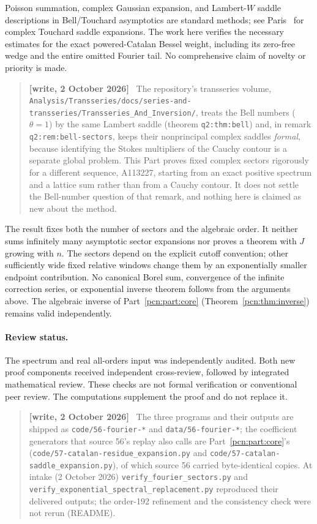 \documentclass[11pt,letterpaper]{article}
\theoremstyle{remark}\newtheorem{remark}[theorem]{Remark}
\newenvironment{writenote}{\par\smallskip\begin{quote}\small\textbf{[write, 2 October 2026]}\ }{\end{quote}\smallskip}
\newcommand{\repopath}[1]{\nolinkurl{#1}}
\begin{document}
Poisson summation, complex Gaussian expansion, and Lambert-$W$ saddle descriptions in \mbox{Bell/Touchard} asymptotics are standard methods; see Paris~\cite{Paris} for complex Touchard saddle expansions. The work here verifies the necessary estimates for the exact powered-Catalan Bessel weight, including its zero-free wedge and the entire omitted Fourier tail. No comprehensive claim of novelty or priority is made.
\begin{writenote}
The repository's transseries volume, \repopath{Analysis/Transseries/docs/series-and-transseries/Transseries_And_Inversion/}, treats the Bell numbers ($\theta=1$) by the same Lambert saddle (theorem \texttt{q2:thm:bell}) and, in remark \texttt{q2:rem:bell-sectors}, keeps their nonprincipal complex saddles \emph{formal}, because identifying the Stokes multipliers of the Cauchy contour is a separate global problem. This Part proves fixed complex sectors rigorously for a different sequence, A113227, starting from an exact positive spectrum and a lattice sum rather than from a Cauchy contour. It does not settle the Bell-number question of that remark, and nothing here is claimed as new about the method.
\end{writenote}

The result fixes both the number of sectors and the algebraic order. It neither sums infinitely many asymptotic sector expansions nor proves a theorem with $J$ growing with $n$. The sectors depend on the explicit cutoff convention; other sufficiently wide fixed relative windows change them by an exponentially smaller endpoint contribution. No canonical Borel sum, convergence of the infinite correction series, or exponential inverse theorem follows from the arguments above. The algebraic inverse of Part~\ref{pcn:part:core} (Theorem~\ref{pcn:thm:inverse}) remains valid independently.

\paragraph{Review status.}
The spectrum and real all-orders input was independently audited. Both new proof components received independent cross-review, followed by integrated mathematical review. These checks are not formal verification or conventional peer review. The computations supplement the proof and do not replace it.
\begin{writenote}
The three programs and their outputs are shipped as \repopath{code/56-fourier-*} and \repopath{data/56-fourier-*}; the coefficient generators that source 56's replay also calls are Part~\ref{pcn:part:core}'s (\repopath{code/57-catalan-residue_expansion.py} and \repopath{code/57-catalan-saddle_expansion.py}), of which source 56 carried byte-identical copies. At intake (2 October 2026) \texttt{verify\_fourier\_sectors.py} and \texttt{verify\_exponential\_spectral\_replacement.py} reproduced their delivered outputs; the order-192 refinement and the consistency check were not rerun (README).
\end{writenote}
\end{document}
